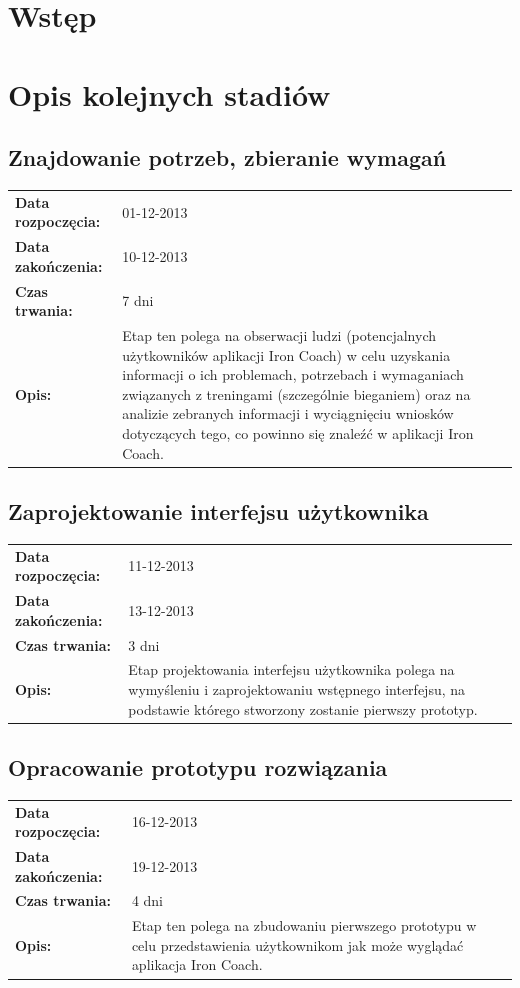 

\tableofcontents
\clearpage
\renewcommand{\subsectionmark}[1]{}
\section{Wstęp}
\section{Opis kolejnych stadiów}
\subsection{Znajdowanie potrzeb, zbieranie wymagań}
	\begin{tabular}{l p{5cm}}
		\textbf{Data rozpoczęcia:} & 01-12-2013\\
		\textbf{Data zakończenia:} & 10-12-2013\\
		\textbf{Czas trwania:} & 7 dni\\
		\textbf{Opis:} & Etap ten polega na obserwacji ludzi (potencjalnych użytkowników aplikacji Iron Coach) w celu uzyskania informacji o ich problemach, potrzebach i wymaganiach związanych z treningami (szczególnie bieganiem) oraz na analizie zebranych informacji i wyciągnięciu wniosków dotyczących tego, co powinno się znaleźć w aplikacji Iron Coach.
	\end{tabular}
\subsection{Zaprojektowanie interfejsu użytkownika}
	\begin{tabular}{l p{5cm}}
		\textbf{Data rozpoczęcia:} & 11-12-2013\\
		\textbf{Data zakończenia:} & 13-12-2013\\
		\textbf{Czas trwania:} & 3 dni\\
		\textbf{Opis:} & Etap projektowania interfejsu użytkownika polega na wymyśleniu i zaprojektowaniu wstępnego interfejsu, na podstawie którego stworzony zostanie pierwszy prototyp.
	\end{tabular}
\subsection{Opracowanie prototypu rozwiązania}
	\begin{tabular}{l p{5cm}}
		\textbf{Data rozpoczęcia:} & 16-12-2013\\
		\textbf{Data zakończenia:} & 19-12-2013\\
		\textbf{Czas trwania:} & 4 dni\\
		\textbf{Opis:} & Etap ten polega na zbudowaniu pierwszego prototypu w celu przedstawienia użytkownikom jak może wyglądać aplikacja Iron Coach.
	\end{tabular}
